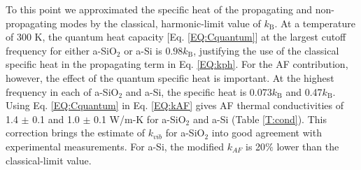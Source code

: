 \documentclass[aps,prb,onecolumn,preprint,superscriptaddress,footinbib,amsmath,amssymb,floatfix]{revtex4}
\begin{document}
To this point we approximated the specific heat 
of the propagating 
and non-propagating modes by the classical, harmonic-limit 
value of $k_{\text{B}}$. At a temperature of $300$ K, the quantum 
heat capacity [Eq. \eqref{EQ:Cquantum}] 
at the largest cutoff frequency for either a-SiO$_2$ or a-Si 
is $0.98 k_{\text{B}}$, justifying the 
use of the classical specific heat in the propagating term 
in Eq. \eqref{EQ:kph}. For the AF contribution, however, the 
effect of the quantum specific heat is important. At the highest 
frequency in each of a-SiO$_2$ and a-Si, the specific heat is 
0.073$k_{\text{B}}$ and 0.47$k_{\text{B}}$. 
Using Eq. \eqref{EQ:Cquantum} 
in Eq. \eqref{EQ:kAF} gives AF thermal conductivities of 
1.4 $\pm$ 0.1 and 
1.0 $\pm$ 0.1 W/m-K for a-SiO$_2$ and a-Si (Table \ref{T:cond}). 
This correction brings the estimate of $k_{vib}$ for 
a-SiO$_2$ into good agreement with experimental measurements.
\cite{cahill_lattice_1988,lee_heat_1997,
yamane_measurement_2002,regner_broadband_2013} 
For a-Si, the modified $k_{AF}$ is 20$\%$ lower than the 
classical-limit value. 
\end{document}
